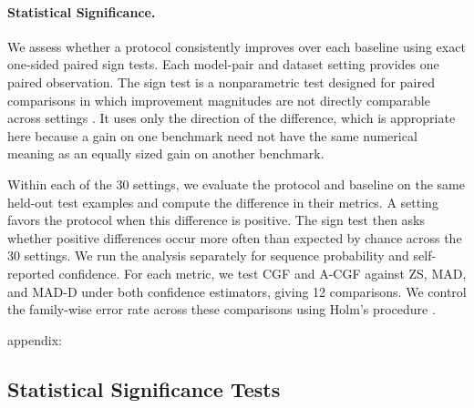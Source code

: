 \paragraph{Statistical Significance.}

We assess whether a protocol consistently improves over each baseline using exact one-sided paired sign tests. Each model-pair and dataset setting provides one paired observation. The sign test is a nonparametric test designed for paired comparisons in which improvement magnitudes are not directly comparable across settings \citep{dixon1946sign}. It uses only the direction of the difference, which is appropriate here because a gain on one benchmark need not have the same numerical meaning as an equally sized gain on another benchmark.

Within each of the 30 settings, we evaluate the protocol and baseline on the same held-out test examples and compute the difference in their metrics. A setting favors the protocol when this difference is positive. The sign test then asks whether positive differences occur more often than expected by chance across the 30 settings. We run the analysis separately for sequence probability and self-reported confidence. For each metric, we test CGF and A-CGF against ZS, MAD, and MAD-D under both confidence estimators, giving 12 comparisons. We control the family-wise error rate across these comparisons using Holm's procedure \citep{holm1979}.


appendix:
\subsection{Statistical Significance Tests}
\label{app:significance}

